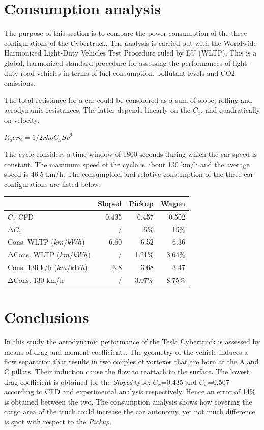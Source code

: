 \documentclass{elbioimp2}
\begin{document}
\section{Consumption analysis}
The purpose of this section is to compare the power consumption of the three configurations of the Cybertruck.
The analysis is carried out with the Worldwide Harmonized Light-Duty Vehicles Test Procedure ruled by EU (WLTP). This is a global, harmonized standard procedure for assessing the performances of light-duty road vehicles in terms of fuel consumption, pollutant levels and CO2 emissions.

The total resistance for a car could be considered as a sum of slope, rolling and aerodynamic resistances. The latter depends linearly on the $C_x$, and quadratically on velocity. 

\begin{math}
     R_aero=  1/2 rho C_xSv^2
\end{math}
   

The cycle considers a time window of 1800 seconds during which the car speed is constant. The maximum  speed of the cycle is about 130 km/h and the average speed is 46.5 km/h. The consumption and relative consumption of the three car configurations are listed below.\\

\begin{tabular}{|l|r|r|r|}
\hline
                    &  Sloped   & Pickup    & Wagon \\
\hline
$C_x$ CFD	            & 0.435	    & 0.457	    & 0.502 \\
\hline
Δ$C_x$	        & /	        & 5\%	    & 15\% \\
\hline
Cons. WLTP ($km/kWh$)	& 6.60	& 6.52    & 6.36 \\
\hline
ΔCons. WLTP ($km/kWh$)  & /	    & 1.21\%	& 3.64\% \\
\hline
Cons. 130 k/h ($km/kWh$) & 3.8 & 3.68 & 3.47 \\
\hline
ΔCons. 130 km/h &    / & 3.07\% & 8.75\% \\
\hline

\end{tabular}
			
\section{Conclusions}
In this study the aerodynamic performance of the Tesla Cybertruck is assessed by means of drag and moment coefficients. The geometry of the vehicle induces a flow separation that results in two couples of vortexes that are born at the A and C pillars. Their induction cause the flow to reattach to the surface. The lowest drag coefficient is obtained for the \emph{Sloped} type: $C_x$=0.435 and $C_x$=0.507 according to CFD and experimental analysis respectively. Hence an error of 14\% is obtained between the two. The consumption analysis shows how covering the cargo area of the truck could increase the car autonomy, yet not much difference is spot with respect to the \emph{Pickup}. 

\newpage
\nocite{*}
\printbibliography
\end{document}
